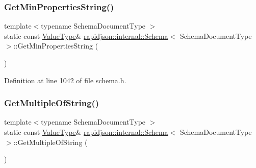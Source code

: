 \subsubsection{\texorpdfstring{GetMinPropertiesString()}{GetMinPropertiesString()}}
{\footnotesize\ttfamily template$<$typename Schema\+Document\+Type $>$ \\
static const \mbox{\hyperlink{classrapidjson_1_1internal_1_1_schema_a3979a9083c598195927c08c6e3ba91d1}{Value\+Type}}\& \mbox{\hyperlink{classrapidjson_1_1internal_1_1_schema}{rapidjson\+::internal\+::\+Schema}}$<$ Schema\+Document\+Type $>$\+::Get\+Min\+Properties\+String (\begin{DoxyParamCaption}{ }\end{DoxyParamCaption})\hspace{0.3cm}{\ttfamily [static]}}



Definition at line 1042 of file schema.\+h.


\begin{DoxyCode}{0}

\end{DoxyCode}
\mbox{\label{classrapidjson_1_1internal_1_1_schema_a90d1a0f854d3706531a6484c9243fdc3}} 
\subsubsection{\texorpdfstring{GetMultipleOfString()}{GetMultipleOfString()}}
{\footnotesize\ttfamily template$<$typename Schema\+Document\+Type $>$ \\
static const \mbox{\hyperlink{classrapidjson_1_1internal_1_1_schema_a3979a9083c598195927c08c6e3ba91d1}{Value\+Type}}\& \mbox{\hyperlink{classrapidjson_1_1internal_1_1_schema}{rapidjson\+::internal\+::\+Schema}}$<$ Schema\+Document\+Type $>$\+::Get\+Multiple\+Of\+String (\begin{DoxyParamCaption}{ }\end{DoxyParamCaption})\hspace{0.3cm}{\ttfamily [static]}}



